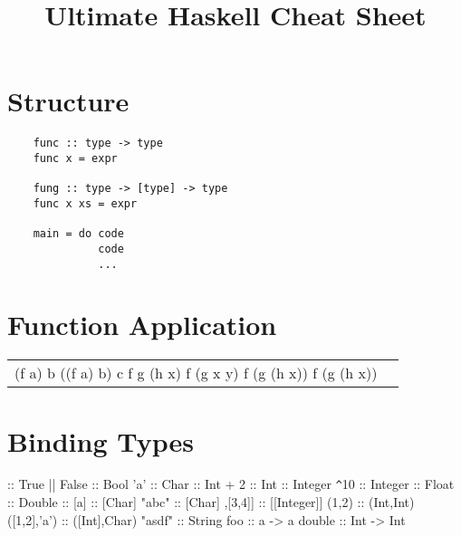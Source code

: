 \documentclass{refcard}
\title{Ultimate Haskell Cheat Sheet}
\begin{document}
\maketitle

\section{Structure}

\begin{verbatim}
	func :: type -> type
	func x = expr

	fung :: type -> [type] -> type
	func x xs = expr

	main = do code
	          code
	          ...
\end{verbatim}


\section{Function Application}

\begin{tabular}{CC}
	\li[f a b] (f a) b
	\li[f a b c] ((f a) b) c
	\li[f g \$ h x] f g (h x)
	\li[f \$ g x y] f (g x y)
	\li[f \$ g \$ h x] f (g (h x))
	\li[(f . g . h) x] f (g (h x))
\end{tabular}


\section{Binding Types}

\begin{ldesc}
	               \s::\s{}
	\li[boolean]                True || False :: Bool
	\li[character]              'a' :: Char
	 :: Int
	 + 2 :: Int
	 :: Integer
	\verb+^+10 :: Integer
	 :: Float 
	 :: Double
	\li[list]                   [] :: [a]
	\li[]                       ['a','b','c'] :: [Char]
	\li                         "abc" :: [Char]
	\li[]                       [[1,2],[3,4]] :: [[Integer]]
	\li[tuple]                  (1,2) :: (Int,Int)
	\li                         ([1,2],'a') :: ([Int],Char)
	\li[string]                 "asdf" :: String
	\li[functions]              foo :: a -> a
	\li                         double :: Int -> Int
\end{ldesc}
\end{document}
